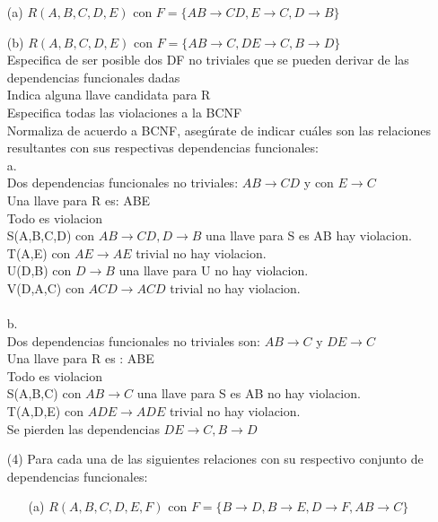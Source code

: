 \documentclass{article}
\begin{document}
\begin{enumerate}
        \item[(a)] $R(A,B,C,D,E)$ con $F=\{ AB \rightarrow CD, E \rightarrow C
        ,D \rightarrow B \}$
        \item[(b)] $R(A,B,C,D,E)$ con $F= \{ AB \rightarrow C, DE \rightarrow C,
        B \rightarrow D \}$\\
      	Especifica de ser posible dos DF no triviales que se pueden derivar de las dependencias funcionales dadas\\
      	Indica alguna llave candidata para R\\
      	Especifica todas las violaciones a la BCNF\\
      	Normaliza de acuerdo a BCNF, asegúrate de indicar cuáles son las relaciones resultantes con sus respectivas dependencias funcionales:\\
      	a.\\
      Dos dependencias funcionales no triviales: $AB \rightarrow CD$ y con $E \rightarrow C$\\
      	Una llave para R es: ABE\\
      	Todo es violacion \\
      	S(A,B,C,D) con $AB \rightarrow CD, D \rightarrow B$ una llave para S es AB hay violacion.\\
      	T(A,E) con $AE \rightarrow AE$ trivial no hay violacion.\\
      	U(D,B) con $D \rightarrow B$ una llave para U no hay violacion.\\
      	V(D,A,C) con $ACD \rightarrow ACD$ trivial no hay violacion.\\
      	\\
      	b.\\
      	Dos dependencias funcionales no triviales son: $AB \rightarrow C$ y $DE \rightarrow C$\\
      	Una llave para R es : ABE\\
      	Todo es violacion\\
      	S(A,B,C) con $AB \rightarrow C$ una llave para S es AB no hay violacion.\\
      	T(A,D,E) con $ADE \rightarrow ADE$ trivial no hay violacion.\\
      	Se pierden las dependencias $DE \rightarrow C, B \rightarrow D$ 
    \item[(4)] Para cada una de las siguientes relaciones con su respectivo
    conjunto de dependencias funcionales:
      \begin{enumerate}
        \item[(a)] $R(A,B,C,D,E,F)$ con $F = \{B\rightarrow D, B \rightarrow E,
        D \rightarrow F, AB \rightarrow C\}$


\end{enumerate}
\end{enumerate}
\end{document}
